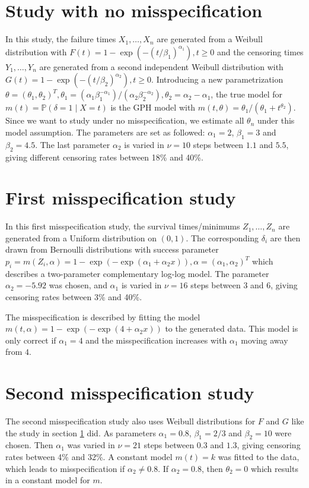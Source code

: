 \section{Study with no misspecification}\label{study1}
In this study, the failure times $X_1,\ldots,X_n$ are generated from a Weibull distribution with $F(t) = 1 - \exp(-(t/\beta_1)^{\alpha_1}), t \geq 0$ and the censoring times $Y_1,\ldots,Y_n$ are generated from a second independent Weibull distribution with $G(t) = 1 - \exp(-(t/\beta_2)^{\alpha_2}), t \geq 0$.
Introducing a new parametrization $\theta = (\theta_1, \theta_2)^T, \theta_1 = (\alpha_1\beta_1^{-\alpha_1})/(\alpha_2\beta_2^{-\alpha_2}), \theta_2 = \alpha_2-\alpha_1$, the true model for $m(t)=\mathbb{P}(\delta=1\mid X=t)$ is the GPH model with $m(t,\theta) = \theta_1/(\theta_1+t^{\theta_2})$. Since we want to study under no misspecification, we estimate all $\theta_n$ under this model assumption.
The parameters are set as followed: $\alpha_1=2$, $\beta_1=3$ and $\beta_2=4.5$. The last parameter $\alpha_2$ is varied in $\nu = 10$ steps between $1.1$ and $5.5$, giving different censoring rates between 18\% and 40\%.

\section{First misspecification study}\label{study2}
In this first misspecification study, the survival times/minimums $Z_1,\ldots,Z_n$ are generated from a Uniform distribution on $(0,1)$. The corresponding $\delta_i$ are then drawn from Bernoulli distributions with success parameter $p_i = m(Z_i,\alpha) = 1-\exp(-\exp(\alpha_1+\alpha_2x)), \alpha = (\alpha_1, \alpha_2)^T$ which describes a two-parameter complementary log-log model. The parameter $\alpha_2 = -5.92$ was chosen, and $\alpha_1$ is varied in $\nu = 16$ steps between $3$ and $6$, giving censoring rates between 3\% and 40\%.

The misspecification is described by fitting the model $m(t,\alpha) = 1-\exp(-\exp(4+\alpha_2x))$ to the generated data. This model is only correct if $\alpha_1 = 4$ and the misspecification increases with $\alpha_1$ moving away from $4$.

\section{Second misspecification study}\label{study3}
The second misspecification study also uses Weibull distributions for $F$ and $G$ like the study in section \ref{study1} did. As parameters $\alpha_1 = 0.8$, $\beta_1=2/3$ and $\beta_2=10$ were chosen. Then $\alpha_1$ was varied in $\nu = 21$ steps between $0.3$ and $1.3$, giving censoring rates between 4\% and 32\%. 
A constant model $m(t) = k$ was fitted to the data, which leads to misspecification if $\alpha_2 \neq 0.8$. If $\alpha_2 = 0.8$, then $\theta_2 = 0$ which results in a constant model for $m$.